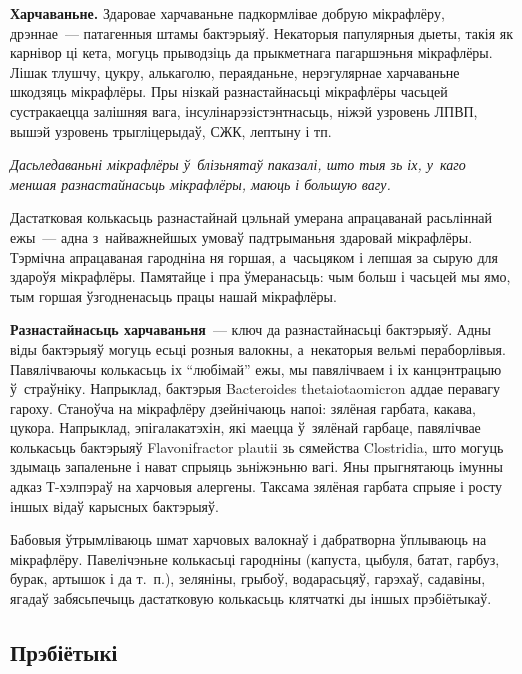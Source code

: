 \textbf{Харчаваньне.} Здаровае харчаваньне падкормлівае добрую мікрафлёру, дрэннае~--- патагенныя штамы бактэрыяў. Некаторыя папулярныя дыеты, такія як карнівор ці кета, могуць прыводзіць да прыкметнага пагаршэньня мікрафлёры. Лішак тлушчу, цукру, алькаголю, пераяданьне, нерэгулярнае харчаваньне шкодзяць мікрафлёры. Пры нізкай разнастайнасьці мікрафлёры часьцей сустракаецца залішняя вага, інсулінарэзістэнтнасьць, ніжэй узровень ЛПВП, вышэй узровень трыгліцерыдаў, СЖК, лептыну і тп.

\emph{Дасьледаваньні мікрафлёры ў~блізьнятаў паказалі, што тыя зь іх, у~каго меншая разнастайнасьць мікрафлёры, маюць і большую вагу.}

Дастатковая колькасьць разнастайнай цэльнай умерана апрацаванай расьліннай ежы~--- адна з~найважнейшых умоваў падтрыманьня здаровай мікрафлёры. Тэрмічна апрацаваная гародніна ня горшая, а~часьцяком і лепшая за сырую для здароўя мікрафлёры. Памятайце і пра ўмеранасьць: чым больш і часьцей мы ямо, тым горшая ўзгодненасьць працы нашай мікрафлёры.

\textbf{Разнастайнасьць харчаваньня}~--- ключ да разнастайнасьці бактэрыяў. Адны віды бактэрыяў могуць есьці розныя валокны, а~некаторыя вельмі пераборлівыя. Павялічваючы колькасьць іх ``любімай'' ежы, мы павялічваем і іх канцэнтрацыю ў~страўніку. Напрыклад, бактэрыя Bacteroides thetaiotaomicron аддае перавагу гароху. Станоўча на мікрафлёру дзейнічаюць напоі: зялёная гарбата, какава, цукора. Напрыклад, эпігалакатэхін, які маецца ў~зялёнай гарбаце, павялічвае колькасьць бактэрыяў Flavonifractor plautii зь сямейства Clostridia, што могуць здымаць запаленьне і нават спрыяць зьніжэньню вагі. Яны прыгнятаюць імунны адказ Т-хэлпэраў на харчовыя алергены. Таксама зялёная гарбата спрыяе і росту іншых відаў карысных бактэрыяў.

Бабовыя ўтрымліваюць шмат харчовых валокнаў і дабратворна ўплываюць на мікрафлёру. Павелічэньне колькасьці гародніны (капуста, цыбуля, батат, гарбуз, бурак, артышок і да т.~п.), зеляніны, грыбоў, водарасьцяў, гарэхаў, садавіны, ягадаў забясьпечыць дастатковую колькасьць клятчаткі ды іншых прэбіётыкаў.


\subsection*{Прэбіётыкі}

